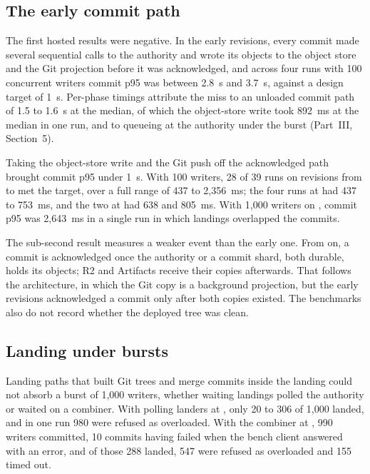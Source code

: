\documentclass[11pt,letterpaper]{article}
\theoremstyle{definition}
\theoremstyle{remark}
\begin{document}
\subsection{The early commit path}

The first hosted results were negative. In the early revisions, every commit made several sequential calls to the authority and wrote its objects to the object store and the Git projection before it was acknowledged, and across four runs with 100 concurrent writers commit p95 was between 2.8~s and 3.7~s, against a design target of 1~s. %
Per-phase timings attribute the miss to an unloaded commit path of 1.5 to 1.6~s at the median, of which the object-store write took 892~ms at the median in one run, and to queueing at the authority under the burst (Part~III, Section~5). %

Taking the object-store write and the Git push off the acknowledged path brought commit p95 under 1~s. With 100 writers, 28 of 39 runs on revisions from  to  met the target, over a full range of 437 to 2,356~ms; the four runs at  had 437 to 753~ms, and the two at  had 638 and 805~ms. %
With 1,000 writers on , commit p95 was 2,643~ms in a single run in which landings overlapped the commits. %

The sub-second result measures a weaker event than the early one. From  on, a commit is acknowledged once the authority or a commit shard, both durable, holds its objects; R2 and Artifacts receive their copies afterwards. That follows the architecture, in which the Git copy is a background projection, but the early revisions acknowledged a commit only after both copies existed. The benchmarks also do not record whether the deployed tree was clean.

\subsection{Landing under bursts}

Landing paths that built Git trees and merge commits inside the landing could not absorb a burst of 1,000 writers, whether waiting landings polled the authority or waited on a combiner. With polling landers at , only 20 to 306 of 1,000 landed, and in one run 980 were refused as overloaded. With the combiner at , 990 writers committed, 10 commits having failed when the bench client answered with an error, and of those 288 landed, 547 were refused as overloaded and 155 timed out. %
\end{document}
